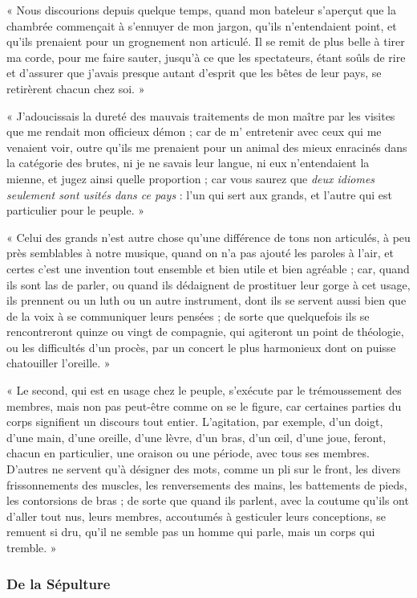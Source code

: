 \documentclass[a4paper, 11pt, oneside]{article}
\begin{document}
« Nous discourions depuis quelque temps, quand mon bateleur s'aperçut que la chambrée commençait à s'ennuyer de mon jargon, qu'ils n'entendaient point, et qu'ils prenaient pour un grognement non articulé. Il se remit de plus belle à tirer ma corde, pour me faire sauter, jusqu'à ce que les spectateurs, étant soûls de rire et d'assurer que j'avais presque autant d'esprit que les bêtes de leur pays, se retirèrent chacun chez soi. »

« J'adoucissais la dureté des mauvais traitements de mon maître par les visites que me rendait mon officieux démon ; car de m' entretenir avec ceux qui me venaient voir, outre qu'ils me prenaient pour un animal des mieux enracinés dans la catégorie des brutes, ni je ne savais leur langue, ni eux n'entendaient la mienne, et jugez ainsi quelle proportion ; car vous saurez que \emph{deux idiomes seulement sont usités dans ce pays} : l'un qui sert aux grands, et l'autre qui est particulier pour le peuple. »

« Celui des grands n'est autre chose qu'une différence de tons non articulés, à peu près semblables à notre musique, quand on n'a pas ajouté les paroles à l'air, et certes c'est une invention tout ensemble et bien utile et bien agréable ; car, quand ils sont las de parler, ou quand ils dédaignent de prostituer leur gorge à cet usage, ils prennent ou un luth ou un autre instrument, dont ils se servent aussi bien que de la voix à se communiquer leurs pensées ; de sorte que quelquefois ils se rencontreront quinze ou vingt de compagnie, qui agiteront un point de théologie, ou les difficultés d'un procès, par un concert le plus harmonieux dont on puisse chatouiller l'oreille. »

« Le second, qui est en usage chez le peuple, s'exécute par le trémoussement des membres, mais non pas peut-être comme on se le figure, car certaines parties du corps signifient un discours tout entier. L'agitation, par exemple, d'un doigt, d'une main, d'une oreille, d'une lèvre, d'un bras, d'un œil, d'une joue, feront, chacun en particulier, une oraison ou une période, avec tous ses membres. D'autres ne servent qu'à désigner des mots, comme un pli sur le front, les divers frissonnements des muscles, les renversements des mains, les battements de pieds, les contorsions de bras ; de sorte que quand ils parlent, avec la coutume qu'ils ont d'aller tout nus, leurs membres, accoutumés à gesticuler leurs conceptions, se remuent si dru, qu'il ne semble pas un homme qui parle, mais un corps qui tremble. »

\subsubsection{De la Sépulture}
\end{document}
